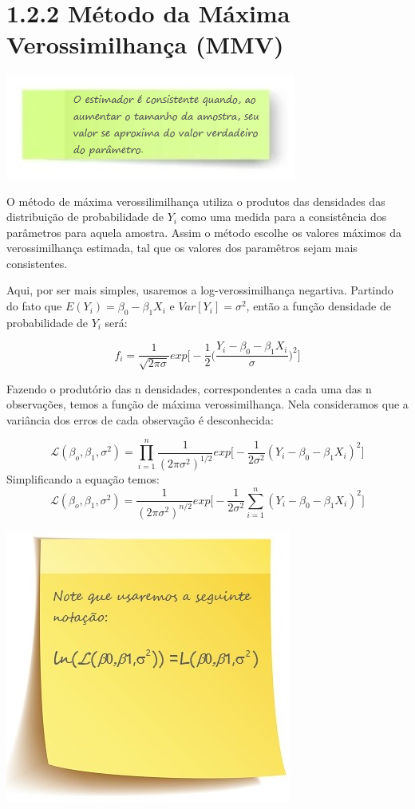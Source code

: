 \documentclass[
]{article}
\begin{document}
~

\hypertarget{muxe9todo-da-muxe1xima-verossimilhanuxe7a-mmv}{%
\section{1.2.2 Método da Máxima Verossimilhança
(MMV)}\label{muxe9todo-da-muxe1xima-verossimilhanuxe7a-mmv}}

\includegraphics{images/note7.png}

O método de máxima verossilimilhança utiliza o produtos das densidades
das distribuição de probabilidade de \(Y_i\) como uma medida para a
consistência dos parâmetros para aquela amostra. Assim o método escolhe
os valores máximos da verossimilhança estimada, tal que os valores dos
paramêtros sejam mais consistentes.

Aqui, por ser mais simples, usaremos a log-verossimilhança negartiva.
Partindo do fato que \(E(Y_i) = \beta_0-\beta_1X_i\) e
\(Var[Y_i]=\sigma^2\), então a função densidade de probabilidade de
\(Y_i\) será:

\[f_i=\frac{1}{\sqrt {2\pi\sigma} }exp\bigg[-\frac{1}{2}\bigg(\frac{Y_i-\beta_0-\beta_1X_i}{\sigma}\bigg)^2 \bigg]\]

Fazendo o produtório das n densidades, correspondentes a cada uma das n
observações, temos a função de máxima verossimilhança. Nela consideramos
que a variância dos erros de cada observação é desconhecida:

\[\mathcal{L}(\beta_o, \beta_1, \sigma^2)=  \prod_{i=1}^{n} \frac{1}{(2\pi\sigma^2)^{1/2}}exp\bigg[-\frac{1}{2\sigma^2}(Y_i-\beta_0-\beta_1X_i)^2 \bigg]\]
Simplificando a equação temos:
\[\mathcal{L}(\beta_o, \beta_1, \sigma^2)=\frac{1}{(2\pi\sigma^2)^{n/2}}exp\bigg[ -\frac{1}{2\sigma^2}\sum_{i=1}^{n}(Y_i-\beta_0-\beta_1X_i)^2\bigg]\]

\includegraphics{images/note2.jpg}
\end{document}
